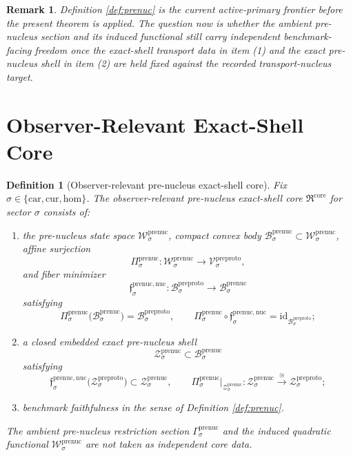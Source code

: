 \documentclass[11pt]{article}
\newcommand{\Car}{\mathrm{car}}
\newcommand{\Cur}{\mathrm{cur}}
\newcommand{\Hom}{\mathrm{hom}}
\newcommand{\PreProtoSpace}[1]{\mathcal V_{#1}^{\mathrm{preproto}}}
\newcommand{\PreProtoBody}[1]{\mathcal B_{#1}^{\mathrm{preproto}}}
\newcommand{\PreProtoShellSet}[1]{\mathcal Z_{#1}^{\mathrm{preproto}}}
\newcommand{\PreNucCore}{\mathfrak R^{\mathrm{core}}}
\newcommand{\PreNucSpace}[1]{\mathcal W_{#1}^{\mathrm{prenuc}}}
\newcommand{\PreNucBody}[1]{\mathcal B_{#1}^{\mathrm{prenuc}}}
\newcommand{\PreNucProj}[1]{\Pi_{#1}^{\mathrm{prenuc}}}
\newcommand{\PreNucNucleusMin}[1]{\mathfrak f_{#1}^{\mathrm{prenuc,nuc}}}
\newcommand{\PreNucSection}[1]{\Gamma_{#1}^{\mathrm{prenuc}}}
\newcommand{\PreNucFunctional}[1]{\mathscr W_{#1}^{\mathrm{prenuc}}}
\newcommand{\PreNucShellSet}[1]{\mathcal Z_{#1}^{\mathrm{prenuc}}}
\newtheorem{definition}{Definition}
\newtheorem{remark}{Remark}
\begin{document}
\begin{remark}
Definition \ref{def:prenuc} is the current active-primary frontier before the present theorem is applied. The question now is whether the ambient pre-nucleus section and its induced functional still carry independent benchmark-facing freedom once the exact-shell transport data in item (1) and the exact pre-nucleus shell in item (2) are held fixed against the recorded transport-nucleus target.
\end{remark}

\section{Observer-Relevant Exact-Shell Core}

\begin{definition}[Observer-relevant pre-nucleus exact-shell core]
\label{def:core}
Fix \(\sigma\in\{\Car,\Cur,\Hom\}\). The \emph{observer-relevant pre-nucleus exact-shell core} \(\PreNucCore\) for sector \(\sigma\) consists of:
\begin{enumerate}
    \item the pre-nucleus state space \(\PreNucSpace{\sigma}\), compact convex body \(\PreNucBody{\sigma}\subset\PreNucSpace{\sigma}\), affine surjection
    \[
    \PreNucProj{\sigma}:\PreNucSpace{\sigma}\to\PreProtoSpace{\sigma},
    \]
    and fiber minimizer
    \[
    \PreNucNucleusMin{\sigma}:\PreProtoBody{\sigma}\to\PreNucBody{\sigma}
    \]
    satisfying
    \[
    \PreNucProj{\sigma}\bigl(\PreNucBody{\sigma}\bigr)=\PreProtoBody{\sigma},
    \qquad
    \PreNucProj{\sigma}\circ\PreNucNucleusMin{\sigma}
    =
    \mathrm{id}_{\PreProtoBody{\sigma}};
    \]
    \item a closed embedded exact pre-nucleus shell
    \[
    \PreNucShellSet{\sigma}\subset\PreNucBody{\sigma}
    \]
    satisfying
    \[
    \PreNucNucleusMin{\sigma}\bigl(\PreProtoShellSet{\sigma}\bigr)
    \subset
    \PreNucShellSet{\sigma},
    \qquad
    \PreNucProj{\sigma}\big|_{\PreNucShellSet{\sigma}}
    :
    \PreNucShellSet{\sigma}
    \xrightarrow{\cong}
    \PreProtoShellSet{\sigma};
    \]
    \item benchmark faithfulness in the sense of Definition \ref{def:prenuc}.
\end{enumerate}
The ambient pre-nucleus restriction section \(\PreNucSection{\sigma}\) and the induced quadratic functional \(\PreNucFunctional{\sigma}\) are \emph{not} taken as independent core data.
\end{definition}
\end{document}
